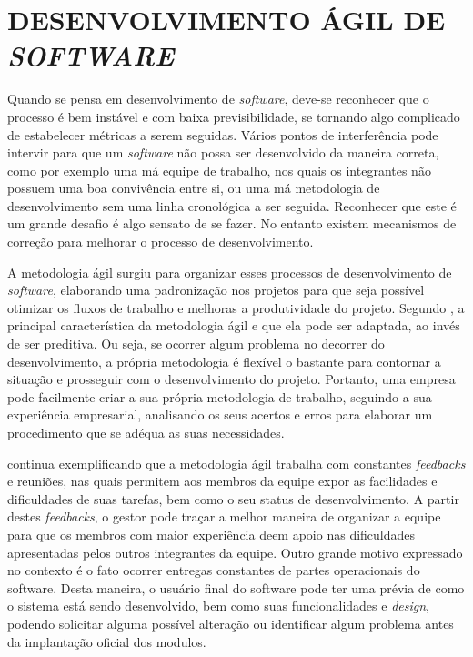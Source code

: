 \section{{DESENVOLVIMENTO ÁGIL DE \textit{SOFTWARE}}}

Quando se pensa em desenvolvimento de \textit{software}, deve-se reconhecer que o processo é bem instável e com baixa previsibilidade, se tornando algo complicado de estabelecer métricas a serem seguidas. Vários pontos de interferência pode intervir para que um \textit{software} não possa ser desenvolvido da maneira correta, como por exemplo uma má equipe de trabalho, nos quais os integrantes não possuem uma boa convivência entre si, ou uma má metodologia de desenvolvimento sem uma linha cronológica a ser seguida. Reconhecer que este é um grande desafio é algo sensato de se fazer. No entanto existem mecanismos de correção para melhorar o processo de desenvolvimento.

A metodologia ágil surgiu para organizar esses processos de desenvolvimento de \textit{software}, elaborando uma padronização nos projetos para que seja possível otimizar os fluxos de trabalho e melhoras a produtividade do projeto. Segundo , a principal característica da metodologia ágil e que ela pode ser adaptada, ao invés de ser preditiva. Ou seja, se ocorrer algum problema no decorrer do desenvolvimento, a própria metodologia é flexível o bastante para contornar a situação e prosseguir com o desenvolvimento do projeto. Portanto, uma empresa pode facilmente criar a sua própria metodologia de trabalho, seguindo a sua experiência empresarial, analisando os seus acertos e erros para elaborar um procedimento que se adéqua as suas necessidades. 

 continua exemplificando que a metodologia ágil trabalha com constantes \textit{feedbacks} e reuniões, nas quais permitem aos membros da equipe expor as facilidades e dificuldades de suas tarefas, bem como o seu status de desenvolvimento. A partir destes \textit{feedbacks}, o gestor pode traçar a melhor maneira de organizar a equipe para que os membros com maior experiência deem apoio nas dificuldades apresentadas pelos outros integrantes da equipe. Outro grande motivo expressado no contexto é o fato ocorrer entregas constantes de partes operacionais do software. Desta maneira, o usuário final do software pode ter uma prévia de como o sistema está sendo desenvolvido, bem como suas funcionalidades e \textit{design}, podendo solicitar alguma possível alteração ou identificar algum problema antes da implantação oficial dos modulos.



